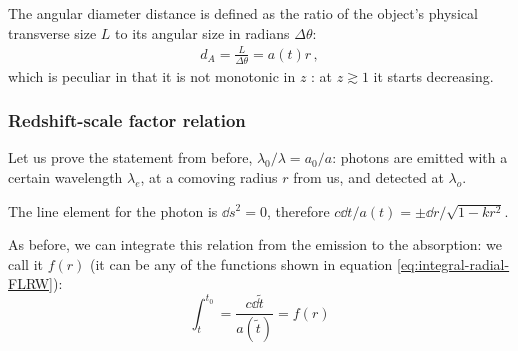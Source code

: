 \documentclass[main.tex]{subfiles}
\begin{document}

\begin{definition}
The angular diameter distance is defined as the ratio of the object's physical transverse size \(L\) to its angular size in radians \(\Delta \theta \): 
%
\begin{align}
d_A = \frac{L}{\Delta \theta } = a(t) r
\,,
\end{align}
%
which is peculiar in that it is not monotonic in \(z\) \cite{hoggDistanceMeasuresCosmology2000}: at \(z \gtrsim 1\) it starts decreasing.
\end{definition}


\subsubsection{Redshift-scale factor relation}

Let us prove the statement from before, \(\lambda_0 / \lambda  = a_0 / a\):
photons are emitted with a certain wavelength \(\lambda_{e}\), at a comoving radius \(r\) from us, and detected at \(\lambda_{o}\).

The line element for the photon is \(\dd{s^2} =0\), therefore \(c\dd{t}/ a(t) = \pm \dd{r} / \sqrt{1-kr^2} \).

As before, we can integrate this relation from the emission to the absorption: we call it \(f(r)\) (it can be any of the functions shown in equation \eqref{eq:integral-radial-FLRW}):
\begin{equation}
  \int_{t}^{t_0 } = \frac{c\dd{\widetilde{t}}}{a(\widetilde{t})} = f(r)
\end{equation}
\end{document}
